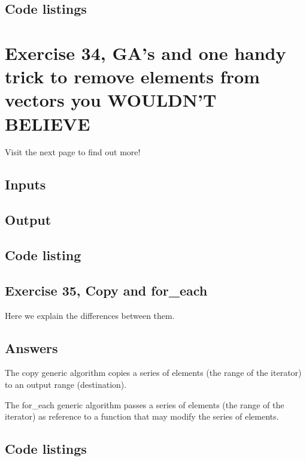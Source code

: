 \documentclass[11pt]{article}
\begin{document}
\subsection*{Code listings}








\section*{Exercise 34, GA's and one handy trick to remove elements from vectors you WOULDN'T BELIEVE}
Visit the next page to find out more!

\subsection*{Inputs}



\subsection*{Output}


\subsection*{Code listing}


\subsection*{Exercise 35, Copy and for\_each}
Here we explain the differences between them.

\subsection*{Answers}
The copy generic algorithm copies a series of elements (the range of
the iterator) to an output range (destination).

The for\_each generic algorithm passes a series of elements (the range
of the iterator) as reference to a function that may modify the
series of elements.

\subsection*{Code listings}


\end{document}
